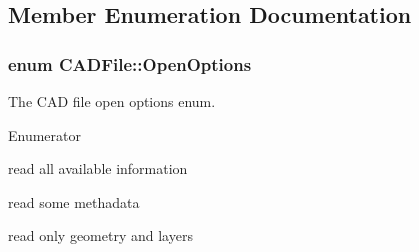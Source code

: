 \subsection{Member Enumeration Documentation}
\subsubsection[{\texorpdfstring{Open\+Options}{OpenOptions}}]{\setlength{\rightskip}{0pt plus 5cm}enum {\bf C\+A\+D\+File\+::\+Open\+Options}}\hypertarget{class_c_a_d_file_a4776c7f9fc5888cac0ee6eede900db5a}{}\label{class_c_a_d_file_a4776c7f9fc5888cac0ee6eede900db5a}


The C\+AD file open options enum. 

\begin{Desc}
\item[Enumerator]\par
\begin{description}
\item[{\em 
R\+E\+A\+D\+\_\+\+A\+LL\hypertarget{class_c_a_d_file_a4776c7f9fc5888cac0ee6eede900db5aa31951f81322352b41b9969dfa90e8239}{}\label{class_c_a_d_file_a4776c7f9fc5888cac0ee6eede900db5aa31951f81322352b41b9969dfa90e8239}
}]read all available information \item[{\em 
R\+E\+A\+D\+\_\+\+F\+A\+ST\hypertarget{class_c_a_d_file_a4776c7f9fc5888cac0ee6eede900db5aab28ae38caf2847fb4895de25acf5cbe7}{}\label{class_c_a_d_file_a4776c7f9fc5888cac0ee6eede900db5aab28ae38caf2847fb4895de25acf5cbe7}
}]read some methadata \item[{\em 
R\+E\+A\+D\+\_\+\+F\+A\+S\+T\+E\+ST\hypertarget{class_c_a_d_file_a4776c7f9fc5888cac0ee6eede900db5aa0a071ae71397d2dcf724cf627e62ec65}{}\label{class_c_a_d_file_a4776c7f9fc5888cac0ee6eede900db5aa0a071ae71397d2dcf724cf627e62ec65}
}]read only geometry and layers \end{description}
\end{Desc}


